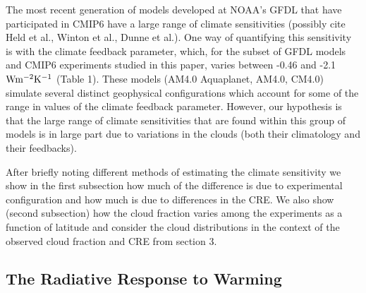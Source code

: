 \documentclass[draft]{agujournal2019}
\begin{document}

The most recent generation of models developed at NOAA's GFDL that have participated in CMIP6 have a large range of climate sensitivities (possibly cite Held et al., Winton et al., Dunne et al.).  
One way of quantifying this sensitivity is with the climate feedback parameter, which, for the subset of GFDL models and CMIP6 experiments studied in this paper, varies between -0.46 and -2.1 $\rm{W m^{-2}K^{-1}}$ (Table 1).  
These models (AM4.0 Aquaplanet, AM4.0, CM4.0) simulate several 
distinct geophysical configurations which account for some of the range in values of the climate feedback parameter.  
However, our hypothesis is that the large range of climate sensitivities that are found within this 
group of models is in large part due to variations in the clouds (both their climatology and their feedbacks).


After briefly noting different methods of estimating the climate sensitivity we show in the first subsection how much of the difference is 
due to experimental configuration and how much is due to differences in the CRE.  
We also show (second subsection) how the cloud fraction varies among
the experiments as a function of latitude and consider the cloud distributions in the context of the observed
cloud fraction and CRE from section 3.  

\subsection{The Radiative Response to Warming}
\end{document}
